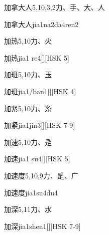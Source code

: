 \begin{Entry}{加拿大人}{5,10,3,2}{⼒、⼿、⼤、⼈}
  \begin{Phonetics}{加拿大人}{jia1na2da4ren2}
  \end{Phonetics}
\end{Entry}

\begin{Entry}{加热}{5,10}{⼒、⽕}
  \begin{Phonetics}{加热}{jia1 re4}[][HSK 5]
  \end{Phonetics}
\end{Entry}

\begin{Entry}{加班}{5,10}{⼒、⽟}
  \begin{Phonetics}{加班}{jia1/ban1}[][HSK 4]
  \end{Phonetics}
\end{Entry}

\begin{Entry}{加紧}{5,10}{⼒、⽷}
  \begin{Phonetics}{加紧}{jia1jin3}[][HSK 7-9]
  \end{Phonetics}
\end{Entry}

\begin{Entry}{加速}{5,10}{⼒、⾡}
  \begin{Phonetics}{加速}{jia1 su4}[][HSK 5]
  \end{Phonetics}
\end{Entry}

\begin{Entry}{加速度}{5,10,9}{⼒、⾡、⼴}
  \begin{Phonetics}{加速度}{jia1su4du4}
  \end{Phonetics}
\end{Entry}

\begin{Entry}{加深}{5,11}{⼒、⽔}
  \begin{Phonetics}{加深}{jia1shen1}[][HSK 7-9]
  \end{Phonetics}
\end{Entry}

